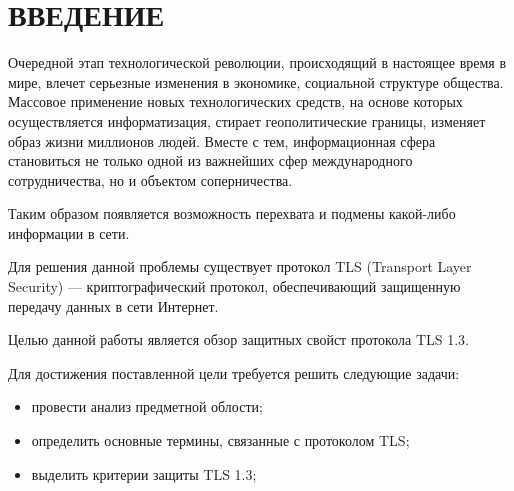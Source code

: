 \chapter*{ВВЕДЕНИЕ}

    Очередной этап технологической революции, происходящий в настоящее время в мире, влечет серьезные изменения в экономике, социальной структуре общества. Массовое применение новых технологических средств, на основе которых осуществляется информатизация, стирает геополитические границы, изменяет образ жизни миллионов людей. Вместе с тем, информационная сфера становиться не только одной из важнейших сфер международного сотрудничества, но и объектом соперничества.
    
    Таким образом появляется возможность перехвата и подмены какой-либо информации в сети.
    
    Для решения данной проблемы существует протокол TLS (Transport Layer Security) --- криптографический протокол, обеспечивающий защищенную передачу данных в сети Интернет.
    
    Целью данной работы является обзор защитных свойст протокола TLS 1.3.
    
    Для достижения поставленной цели требуется решить следующие задачи:
    
    \begin{itemize}
    	\item провести анализ предметной облости;
        \item определить основные термины, связанные с протоколом TLS;
        \item выделить критерии защиты TLS 1.3;
    \end{itemize}